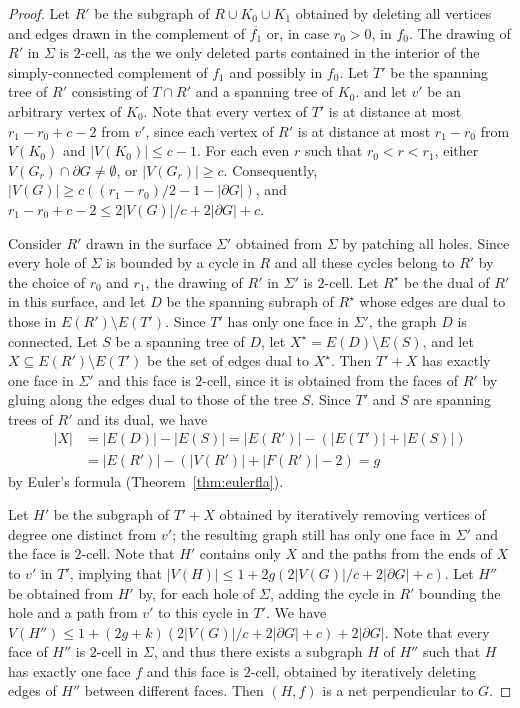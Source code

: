 \documentclass[12pt,twoside,openright,a4paper]{book}
\begin{document}
\begin{proof}
Let $R'$ be the subgraph of $R\cup K_0\cup K_1$ obtained by deleting all vertices and
edges drawn in the complement of $\overline{f_1}$ or, in case $r_0>0$, in $f_0$.  The drawing of $R'$ in $\Sigma$ is $2$-cell,
as the we only deleted parts contained in the interior of the simply-connected complement of $f_1$ and possibly in $f_0$.
Let $T'$ be the spanning tree of $R'$ consisting of $T\cap R'$ and a spanning tree of $K_0$.
and let $v'$ be an arbitrary vertex of $K_0$.
Note that every vertex of $T'$ is at distance at most $r_1-r_0+c-2$ from $v'$, since each vertex of $R'$
is at distance at most $r_1-r_0$ from $V(K_0)$ and $|V(K_0)|\le c-1$.
For each even $r$ such that $r_0<r<r_1$, either $V(G_{r})\cap \partial G\neq \emptyset$,
or $|V(G_r)|\ge c$.  Consequently, $|V(G)|\ge c((r_1-r_0)/2-1-|\partial G|)$, and $r_1-r_0+c-2\le 2|V(G)|/c+2|\partial G|+c$.

Consider $R'$ drawn in the surface $\Sigma'$ obtained from $\Sigma$ by patching all holes.
Since every hole of $\Sigma$ is bounded by a cycle in $R$ and all these cycles belong to $R'$ by the choice of $r_0$ and $r_1$,
the drawing of $R'$ in $\Sigma'$ is $2$-cell.  Let $R^\star$ be the dual of $R'$ in this surface, and let $D$ be
the spanning subraph of $R^\star$ whose edges are dual to those in $E(R')\setminus E(T')$.  Since $T'$ has only one face in $\Sigma'$,
the graph $D$ is connected.  Let $S$ be a spanning tree of $D$, let $X^\star=E(D)\setminus E(S)$, and let $X\subseteq E(R')\setminus E(T')$
be the set of edges dual to $X^\star$.  Then $T'+X$ has exactly one face in $\Sigma'$ and this face is $2$-cell, since it
is obtained from the faces of $R'$ by gluing along the edges dual to those of the tree $S$.  Since $T'$ and $S$ are spanning trees
of $R'$ and its dual, we have
\begin{align*}
|X|&=|E(D)|-|E(S)|=|E(R')|-(|E(T')|+|E(S)|)\\
&=|E(R')|-(|V(R')|+|F(R')|-2)=g
\end{align*}
by Euler's formula (Theorem~\ref{thm:eulerfla}).

Let $H'$ be the subgraph of $T'+X$ obtained by iteratively removing vertices of degree one distinct from $v'$; the resulting graph
still has only one face in $\Sigma'$ and the face is $2$-cell.  Note that $H'$ contains only $X$ and
the paths from the ends of $X$ to $v'$ in $T'$, implying that $|V(H)|\le 1+2g(2|V(G)|/c+2|\partial G|+c)$.
Let $H''$ be obtained from $H'$ by, for each hole of $\Sigma$, adding the cycle in $R'$ bounding the hole
and a path from $v'$ to this cycle in $T'$.  We have $V(H'')\le 1+(2g+k)(2|V(G)|/c+2|\partial G|+c)+2|\partial G|$.
Note that every face of $H''$ is $2$-cell in $\Sigma$, and thus there exists a subgraph $H$ of $H''$ such that
$H$ has exactly one face $f$ and this face is $2$-cell, obtained by iteratively deleting edges of $H''$ between different faces.
Then $(H,f)$ is a net perpendicular to $G$.
\end{proof}
\end{document}
